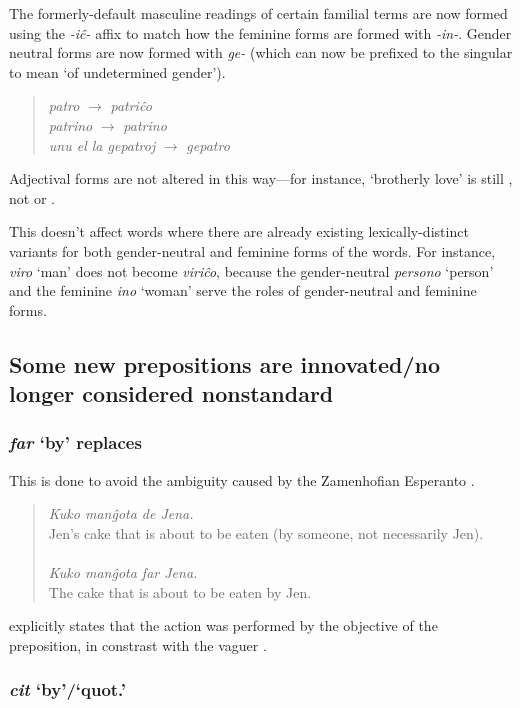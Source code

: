 The formerly-default masculine readings of certain familial terms are now formed using the \textit{-iĉ-} affix to match how the feminine forms are formed with \textit{-in-}. Gender neutral forms are now formed with \textit{ge-} (which can now be prefixed to the singular to mean `of undetermined gender').
\begin{quote}
\textit{patro} $\to$ \textit{patriĉo}\\
\textit{patrino} $\to$ \textit{patrino}\\
\textit{unu el la gepatroj} $\to$ \textit{gepatro}
\end{quote}
Adjectival forms are not altered in this way---for instance, `brotherly love' is still , not  or .

This doesn't affect words where there are already existing lexically-distinct variants for both gender-neutral and feminine forms of the words. For instance, \textit{viro} `man' does not become \textit{viriĉo}, because the gender-neutral \textit{persono} `person' and the feminine \textit{ino} `woman' serve the roles of gender-neutral and feminine forms.

\subsection{Some new prepositions are innovated/no longer considered nonstandard}

\subsubsection{\textit{far} `by' replaces }

This is done to avoid the ambiguity caused by the Zamenhofian Esperanto .
\begin{quote}
    \textit{Kuko manĝota de Jena.}\\
    Jen's cake that is about to be eaten (by someone, not necessarily Jen).\\
    \\
    \textit{Kuko manĝota far Jena.}\\
    The cake that is about to be eaten by Jen.
\end{quote}
 explicitly states that the action was performed by the objective of the preposition, in constrast with the vaguer .

\subsubsection{\textit{cit} `by'/`quot.'}

